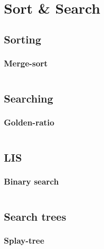 \section{Sort \& Search}

\subsection{Sorting}
\subsubsection{Merge-sort}
\inputminted{cpp}{../code/sort/merge_sort.cpp}


\subsection{Searching}
\subsubsection{Golden-ratio}
\inputminted{cpp}{../code/sort/golden_ratio.cpp}

\subsection{LIS}
\subsubsection{Binary search}
\inputminted{cpp}{../code/sort/LIS/binary_search.cpp}

\subsection{Search trees}
\subsubsection{Splay-tree}
\inputminted{cpp}{../code/sort/tree/splay.cpp}